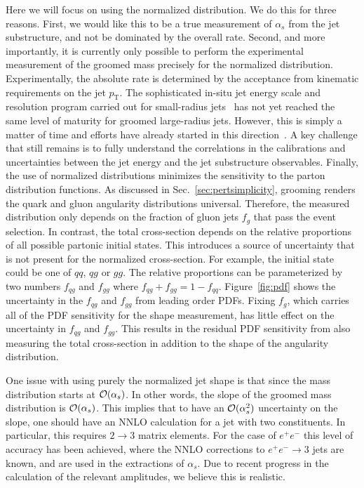 Here we will focus on using the normalized distribution. We do this for three reasons. First, we would like this to be a true measurement of $\alpha_s$ from the jet substructure, and not be dominated by the overall rate. Second, and more importantly, it is currently only possible to perform the experimental measurement of the groomed mass precisely for the normalized distribution.  Experimentally, the absolute rate is determined by the acceptance from kinematic requirements on the jet $p_\text{T}$.  The sophisticated in-situ jet energy scale and resolution program carried out for small-radius jets~\cite{Aad:2014bia,Aaboud:2017jcu,Khachatryan:2016kdb,CMS-DP-2016-020} has not yet reached the same level of maturity for groomed large-radius jets.  However, this is simply a matter of time and efforts have already started in this direction~\cite{ATLAS-CONF-2017-063}.  A key challenge that still remains is to fully understand the correlations in the calibrations and uncertainties between the jet energy and the jet substructure observables.  Finally, the use of normalized distributions minimizes the sensitivity to the parton distribution functions.  As discussed in Sec.~\ref{sec:pertsimplicity}, grooming renders the quark and gluon angularity distributions universal.  Therefore, the measured distribution only depends on the fraction of gluon jets $f_g$ that pass the event selection.  In contrast, the total cross-section depends on the relative proportions of all possible partonic initial states.  This introduces a source of uncertainty that is not present for the normalized cross-section.  For example, the initial state could be one of $qq$, $qg$ or $gg$.  The relative proportions can be parameterized by two numbers $f_{qg}$ and $f_{gg}$ where $f_{qg}+f_{gg}=1-f_{qq}$.   Figure~\ref{fig:pdf} shows the uncertainty in the $f_{qg}$ and $f_{gg}$ from leading order PDFs.  Fixing $f_g$, which carries all of the PDF sensitivity for the shape measurement, has little effect on the uncertainty in $f_{qg}$ and $f_{gg}$.  This results in the residual PDF sensitivity from also measuring the total cross-section in addition to the shape of the angularity distribution.





One issue with using purely the normalized jet shape is that since the mass distribution starts at ${\mathcal O}(\alpha_s)$. In other words, the slope of the groomed mass distribution is ${\mathcal O}(\alpha_s)$. This implies that to have an ${\mathcal O}(\alpha_s^2)$ uncertainty on the slope, one should have an NNLO calculation for a jet with two constituents.  In particular, this requires $2\to 3$ matrix elements. For the case of $e^+e^-$ this level of accuracy has been achieved, where the NNLO corrections to $e^+e^-\to 3$ jets are known, and are used in the extractions of $\alpha_s$. Due to recent progress in the calculation of the relevant amplitudes, we believe this is realistic.



